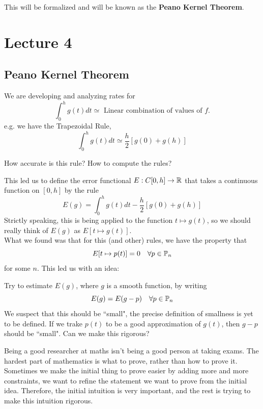 \documentclass{article}
\begin{document}
This will be formalized and will be known as the \textbf{Peano Kernel Theorem}.

\newpage
\section{Lecture 4}

\subsection{Peano Kernel Theorem}

We are developing and analyzing rates for
\[\int_0^h g(t) dt \simeq \text{ Linear combination of values of $f$.}\]
e.g. we have the Trapezoidal Rule, 
\[\int_0^h g(t) dt \simeq \frac{h}{2} [g(0) + g(h)]\]

\begin{question}
    How accurate is this rule? How to compute the rules?
\end{question}

This led us to define the error functional $E: C[0, h] \to \mathbb{R}$ that takes a continuous function on $[0, h]$ by the rule
\[E(g) = \int_0^h g(t) dt - \frac{h}{2} [g(0) + g(h)]\]
Strictly speaking, this is being applied to the function $t \mapsto g(t)$, so we should really think of $E(g)$ as $E[t \mapsto g(t)]$.\\

What we found was that for this (and other) rules, we have the property that
\[E[t \mapsto p(t)] = 0 \quad \forall p \in \mathbb{P}_n\]
for some $n$. This led us with an idea:

\begin{idea}
Try to estimate $E(g)$, where $g$ is a smooth function, by writing
\[E(g) = E(g - p) \quad \forall p \in \mathbb{P}_n\]
We suspect that this should be ``small", the precise definition of smallness is yet to be defined. If we trake $p(t)$ to be a good approximation of $g(t)$, then $g - p$ should be ``small". Can we make this rigorous?
\end{idea}

\begin{remark}
    Being a good researcher at maths isn't being a good person at taking exams. The hardest part of mathematics is what to prove, rather than how to prove it. Sometimes we make the initial thing to prove easier by adding more and more constraints, we want to refine the statement we want to prove from the initial idea. Therefore, the initial intuition is very important, and the rest is trying to make this intuition rigorous.
\end{remark}
\end{document}
